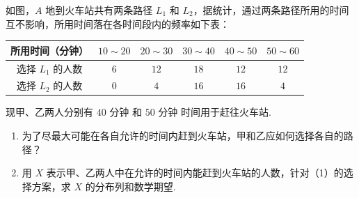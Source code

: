 \begin{problem}
如图，\(A\) 地到火车站共有两条路径 \(L_{1}\) 和 \(L_{2}\)，据统计，通过两条路径所用的时间互不影响，所用时间落在各时间段内的频率如下表：
\begin{center}
\begin{tabular}{c|ccccc}
\hline
所用时间（分钟） & \(10\sim20\) & \(20\sim30\) & \(30\sim40\) & \(40\sim50\) & \(50\sim60\) \\
\hline
选择 \(L_1\) 的人数 & \(6\) & \(12\) & \(18\) & \(12\) & \(12\) \\
选择 \(L_2\) 的人数 & \(0\) & \(4\) & \(16\) & \(16\) & \(4\) \\
\hline
\end{tabular}
\end{center}
现甲、乙两人分别有 \(40\text{ 分钟}\) 和 \(50\text{ 分钟}\) 时间用于赶往火车站.
\begin{enumerate}
\item 为了尽最大可能在各自允许的时间内赶到火车站，甲和乙应如何选择各自的路径？
\item 用 \(X\) 表示甲、乙两人中在允许的时间内能赶到火车站的人数，针对（1）的选择方案，求 \(X\) 的分布列和数学期望.
\end{enumerate}

\begingroup
\leftskip=0pt\relax
{}
\endgroup
\end{problem}

